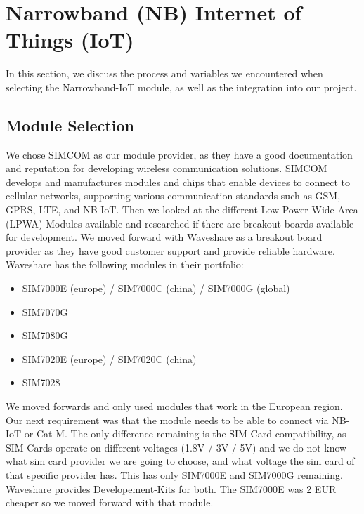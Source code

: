 
\section{Narrowband (NB) Internet of Things (IoT)}
In this section, we discuss the process and variables we encountered when selecting the Narrowband-IoT module, as well as the integration into our project.
\subsection{Module Selection}
We chose SIMCOM as our module provider, as they have a good documentation and reputation for developing wireless communication solutions. SIMCOM develops and manufactures modules and chips that enable devices to connect to cellular networks, supporting various communication standards such as GSM, GPRS, LTE, and NB-IoT.  \cite{SIMCOM_ABOUT}
Then we looked at the different Low Power Wide Area (LPWA) Modules available and researched if there are breakout boards available for development.
We moved forward with Waveshare as a breakout board provider as they have good customer support and provide reliable hardware. Waveshare has the following modules in their portfolio:
\begin{itemize}
    \item SIM7000E (europe) / SIM7000C (china) / SIM7000G (global)
    \item SIM7070G
    \item SIM7080G
    \item SIM7020E (europe) / SIM7020C (china)
    \item SIM7028
\end{itemize}
We moved forwards and only used modules that work in the European region.
Our next requirement was that the module needs to be able to connect via NB-IoT or Cat-M.
The only difference remaining is the SIM-Card compatibility, as SIM-Cards operate on different voltages (1.8V / 3V / 5V) and we do not know what sim card provider we are going to choose, and what voltage the sim card of that specific provider has.
This has only SIM7000E and SIM7000G remaining. Waveshare provides Developement-Kits for both. The SIM7000E was 2 EUR cheaper so we moved forward with that module.
